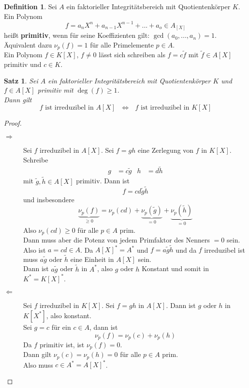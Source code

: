 \documentclass[10pt,a4paper]{article}
\theoremstyle{plain}
\newtheorem{satz}[theorem]{Satz}
\theoremstyle{definition}
\newtheorem{definition}[theorem]{Definition}
\theoremstyle{remark}
\begin{document}
	\begin{definition}
		Sei $A$ ein faktorieller Integritätsbereich mit Quotientenkörper $K$.\\
		Ein Polynom
		\[f=a_nX^n+a_{n-1}X^{n-1}+...+a_o\in A_[X]\]
		heißt \textbf{primitiv}, wenn für seine Koeffizienten gilt: $\gcd(a_0,...,a_n)=1$.\\
		Äquivalent dazu $\nu_p(f)=1$ für alle Primelemente $p\in A$.\\
		Ein Polynom $f\in K[X]$, $f\neq 0$ lässt sich schreiben als $f=c\tilde f$ mit $\tilde f\in A[X]$ primitiv und $c\in K$.
	\end{definition}
	
	\begin{satz}\label{vorsatzvong}
		Sei $A$ ein faktorieller Integritätsbereich mit Quotientenkörper $K$ und $f\in A[X]$ primitiv mit $\deg(f)\geq1$.\\
		Dann gilt
		\[\text{$f$ ist irreduzibel in $A[X]$ }\Leftrightarrow \text{ $f$ ist irreduzibel in $K[X]$}\]
	\end{satz}
	\begin{proof}
		\begin{description}
			\item[$\Rightarrow$] Sei $f$ irreduzibel in $A[X]$. Sei $f=gh$ eine Zerlegung von $f$ in $K[X]$.\\
			Schreibe
			\begin{align*}
			g&=c\tilde g&h&=d\tilde h
			\end{align*}
			mit $\tilde{g},\tilde h\in A[X]$ primitiv. Dann ist
			\[f=cd\tilde g\tilde h\]
			und insbesondere
			\[\underbrace{\nu_p(f)}_{\geq 0}=\nu_p(cd)+\underbrace{\nu_p(\tilde g)}_{=0}+\underbrace{\nu_p(\tilde h)}_{=0}\]
			Also $\nu_p(cd)\geq 0$ für alle $p\in A$ prim.\\
			Dann muss aber die Potenz von jedem Primfaktor des Nenners $=0$ sein.\\
			Also ist $a=cd\in A$. Da $A[X]^*=A^*$ und $f=a\tilde g\tilde h$ und da $f$ irreduzibel ist muss $a\tilde g$ oder $\tilde h$ eine Einheit in $A[X]$ sein.\\
			Dann ist $a\tilde g$ oder $\tilde h$ in $A^*$, also $g$ oder $h$ Konstant und somit in $K^*=K[X]^*$.
			\item[$\Leftarrow$] Sei $f$ irreduzibel in $K[X]$. Sei $f=gh$ in $A[X]$. Dann ist $g$ oder $h$ in $K[X^*]$, also konstant.\\
			Sei $g=c$ für ein $c\in A$, dann ist
			\[\nu_p(f)=\nu_p(c)+\nu_p(h)\]
			Da $f$ primitiv ist, ist $\nu_p(f)=0$.\\
			Dann gilt $\nu_p(c)=\nu_p(h)=0$ für alle $p\in A$ prim.\\
			Also muss $c\in A^*=A[X]^*$.
		\end{description}
	\end{proof}
\end{document}
